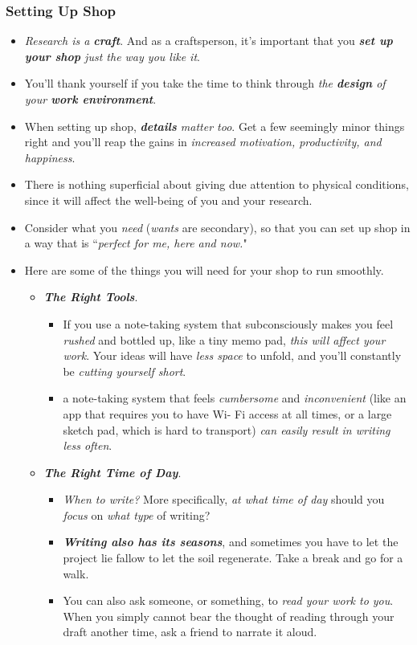 \documentclass[11pt]{article}
\begin{document}
\subsubsection{Setting Up Shop}
\begin{itemize}
\item \emph{Research is a \textbf{craft}}. And as a craftsperson, it’s important that you \emph{\textbf{set up your shop} just the way you like it}.

\item You’ll thank yourself if you take the time to think through \emph{the \textbf{design} of your \textbf{work environment}}.

\item When setting up shop, \emph{\textbf{details} matter too}. Get a few seemingly minor things right and you’ll reap the gains in \emph{increased motivation, productivity, and happiness}. 

\item There is nothing superficial about giving due attention to physical conditions, since it will affect the well-being of you and your research.

\item Consider what you \emph{need} (\emph{wants} are secondary), so that you can set up shop in a way that is ``\emph{perfect for me, here and now.}"

\item Here are some of the things you will need for your shop to run smoothly.
\begin{itemize}
\item \emph{\textbf{The Right Tools}}.
\begin{itemize}
\item If you use a note-taking system that subconsciously makes you feel \emph{rushed} and bottled up, like a tiny memo pad, \emph{this will affect your work}. Your ideas will have \emph{less space} to unfold, and you’ll constantly be \emph{cutting yourself short}. 
\item a note-taking system that feels \emph{cumbersome} and \emph{inconvenient} (like an app that requires you to have Wi- Fi access at all times, or a large sketch pad, which is hard to transport) \emph{can easily result in writing less often}. 
\end{itemize}
\item \emph{\textbf{The Right Time of Day}}.
\begin{itemize}
\item \emph{When to write?} More specifically, \emph{at what time of day} should you \emph{focus} on \emph{what type} of writing? 
\item \emph{\textbf{Writing also has its seasons}}, and sometimes you have to let the project lie fallow to let the soil regenerate. Take a break and go for a walk.
\item You can also ask someone, or something, to \emph{read your work to you}.  When you simply cannot bear the thought of reading through your draft another time, ask a friend to narrate it aloud. 
\end{itemize}
\end{itemize}


\end{itemize}
\end{document}
